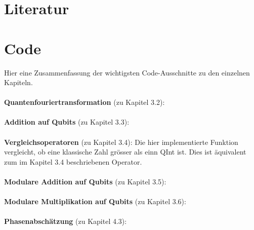 \section{Literatur}
\printbibliography[heading=none]
\pagebreak
\section{Code}
Hier eine Zusammenfassung der wichtigsten Code-Ausschnitte zu den einzelnen Kapiteln.
\paragraph{}

\textbf{Quantenfouriertransformation} (zu Kapitel 3.2):

\paragraph{}

\textbf{Addition auf Qubits} (zu Kapitel 3.3):

\paragraph{}

\textbf{Vergleichsoperatoren} (zu Kapitel 3.4):
\newline
Die hier implementierte Funktion vergleicht, ob eine klassische Zahl grösser als einn QInt ist. Dies ist äquivalent zum im Kapitel 3.4 beschriebenen Operator.

\paragraph{}

\textbf{Modulare Addition auf Qubits} (zu Kapitel 3.5):

\paragraph{}

\textbf{Modulare Multiplikation auf Qubits} (zu Kapitel 3.6):

\paragraph{}

\textbf{Phasenabschätzung} (zu Kapitel 4.3):

\paragraph{}

